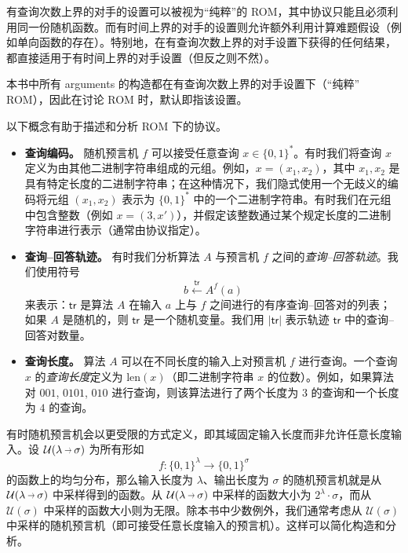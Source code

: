\documentclass[american,singlepageview]{snargs-book-zh}
\newcommand{\DoQuote}[1]{``#1''}
\newcommand{\Bits}{\{0,1\}}
\newcommand{\Cardinality}[1]{\left|{#1}\right|}
\newcommand{\BitSize}[1]{\mathrm{len}(#1)}
\newcommand{\ProtoAdversary}{A}
\newcommand{\ROFunction}{f}
\newcommand{\RODistribution}[1]{\mathcal{U}(#1)}
\newcommand{\ROIODistribution}[2]{\mathcal{U}(#1 \scalebox{0.65}[1]{ $\to$ } #2)}
\newcommand{\ROOutputAndTrace}[4]{#4 \xleftarrow{#3} {#2}^{#1}}
\newcommand{\ROQuery}{x}
\newcommand{\ROTrace}{\mathsf{tr}}
\newcommand{\ROAdversary}{\ProtoAdversary}
\newcommand{\ROInputSize}{\lambda}
\newcommand{\ROOutputSize}{\sigma}
\begin{document}
有查询次数上界的对手的设置可以被视为\DoQuote{纯粹}的 ROM，其中协议只能且必须利用同一份随机函数。而有时间上界的对手的设置则允许额外利用计算难题假设（例如单向函数的存在）。特别地，在有查询次数上界的对手设置下获得的任何结果，都直接适用于有时间上界的对手设置（但反之则不然）。

本书中所有 arguments 的构造都在有查询次数上界的对手设置下（\DoQuote{纯粹} ROM），因此在讨论 ROM 时，默认即指该设置。

以下概念有助于描述和分析 ROM 下的协议。
\begin{itemize}

  \item \textbf{查询编码。} 随机预言机 $\ROFunction$ 可以接受任意查询 $\ROQuery \in \Bits^{*}$。有时我们将查询 $\ROQuery$ 定义为由其他二进制字符串组成的元组。例如，$\ROQuery = (\ROQuery_{1}, \ROQuery_{2})$，其中 $\ROQuery_{1}, \ROQuery_{2}$ 是具有特定长度的二进制字符串；在这种情况下，我们隐式使用一个无歧义的编码将元组 $(\ROQuery_{1}, \ROQuery_{2})$ 表示为 $\Bits^{*}$ 中的一个二进制字符串。有时我们在元组中包含整数（例如 $\ROQuery = (3,\ROQuery')$），并假定该整数通过某个规定长度的二进制字符串进行表示（通常由协议指定）。

  \item \textbf{查询–回答轨迹。} 有时我们分析算法 $\ROAdversary$ 与预言机 $\ROFunction$ 之间的\emph{查询–回答轨迹}。我们使用符号
  \begin{equation*}
  \ROOutputAndTrace{\ROFunction}{\ROAdversary}{\ROTrace}{b}(a)
  \end{equation*}
  来表示：$\ROTrace$ 是算法 $\ROAdversary$ 在输入 $a$ 上与 $\ROFunction$ 之间进行的有序查询–回答对的列表；如果 $\ROAdversary$ 是随机的，则 $\ROTrace$ 是一个随机变量。我们用 $\Cardinality{\ROTrace}$ 表示轨迹 $\ROTrace$ 中的查询–回答对数量。

  \item \textbf{查询长度。} 算法 $\ROAdversary$ 可以在不同长度的输入上对预言机 $\ROFunction$ 进行查询。一个查询 $\ROQuery$ 的\emph{查询长度}定义为 $\BitSize{\ROQuery}$（即二进制字符串 $\ROQuery$ 的位数）。例如，如果算法对 $001$, $0101$, $010$ 进行查询，则该算法进行了两个长度为 $3$ 的查询和一个长度为 $4$ 的查询。

\end{itemize}

\begin{remark}[输入长度固定的预言机]
\label{remark:finite-vs-infinite-oracle}
有时随机预言机会以更受限的方式定义，即其域固定输入长度而非允许任意长度输入。设 $\ROIODistribution{\ROInputSize}{\ROOutputSize}$ 为所有形如
$$
\ROFunction \colon \Bits^{\ROInputSize} \to \Bits^{\ROOutputSize}
$$
的函数上的均匀分布，那么输入长度为 $\ROInputSize$、输出长度为 $\ROOutputSize$ 的随机预言机就是从 $\ROIODistribution{\ROInputSize}{\ROOutputSize}$ 中采样得到的函数。从 $\ROIODistribution{\ROInputSize}{\ROOutputSize}$ 中采样的函数大小为 $2^{\ROInputSize}\cdot \ROOutputSize$，而从 $\RODistribution{\ROOutputSize}$ 中采样的函数大小则为无限。除本书中少数例外，我们通常考虑从 $\RODistribution{\ROOutputSize}$ 中采样的随机预言机（即可接受任意长度输入的预言机）。这样可以简化构造和分析。
\end{remark}
\end{document}
